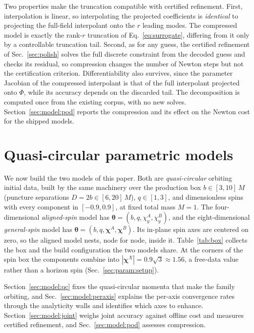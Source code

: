 \documentclass[
  aps,
  prd,
  twocolumn,
  10pt,
  amsmath,
  amssymb,
  nofootinbib,
  superscriptaddress,
  floatfix,
]{revtex4-2}
\newcommand{\vect}[1]{\boldsymbol{#1}}
\begin{document}
Two properties make the truncation compatible with certified refinement. First,
interpolation is linear, so interpolating the projected coefficients is
\emph{identical} to projecting the full-field interpolant onto the $r$ leading
modes.
The compressed model is exactly the rank-$r$ truncation of Eq.~\eqref{eq:surrogate}, differing from it only by a controllable truncation tail.
Second, as for any guess, the certified refinement of Sec.~\ref{sec:polish} solves the full discrete constraint from the decoded guess and checks its residual, so compression changes the number of Newton steps but not the certification criterion.
Differentiability also survives, since the parameter Jacobian of the compressed interpolant is that of the full interpolant projected onto $\Phi$, while its accuracy depends on the discarded tail.
The decomposition is computed once from the existing corpus, with no new solves.
Section~\ref{sec:model:pod} reports the compression and its effect on the Newton cost for the shipped models.


\section{Quasi-circular parametric models}
\label{sec:model}
We now build the two models of this paper.
Both are \emph{quasi-circular} orbiting initial data, built by the same machinery over the production box $b\in[3,10]\,M$ (puncture separations $D=2b\in[6,20]\,M$), $q\in[1,3]$, and dimensionless spins with every component in $[-0.9,0.9]$, at fixed total mass $M=1$.
The four-dimensional \emph{aligned-spin} model has $\vect{\theta}=(b,q,\chi^{A}_{y},\chi^{B}_{y})$, and the eight-dimensional \emph{general-spin} model has $\vect{\theta}=(b,q,\boldsymbol{\chi}^{A},\boldsymbol{\chi}^{B})$.
Its in-plane spin axes are centered on zero, so the aligned model nests, node for node, inside it.
Table~\ref{tab:box} collects the box and the build configuration the two models share.
At the corners of the spin box the components combine into $|\boldsymbol{\chi}^{X}|=0.9\sqrt3\approx1.56$, a free-data value rather than a horizon spin (Sec.~\ref{sec:param:setup}).

Section~\ref{sec:model:qc} fixes the quasi-circular momenta that make the family orbiting, and Sec.~\ref{sec:model:peraxis} explains the per-axis convergence rates through the analyticity walls and identifies which axes to enhance.
Section~\ref{sec:model:joint} weighs joint accuracy against offline cost and measures certified refinement, and Sec.~\ref{sec:model:pod} assesses compression.
\end{document}
